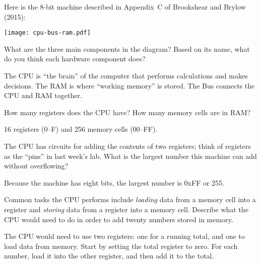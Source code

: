 \label{architecture}

Here is the 8-bit machine described in Appendix~C of Brookshear and Brylow (2015):

\begin{center}
\texttt{[image: cpu-bus-ram.pdf]}
\end{center}




\Q What are the three main components in the diagram?
Based on its name, what do you think each hardware component does?

\begin{answer}
The CPU is ``the brain'' of the computer that performs calculations and makes decisions.
The RAM is where ``working memory'' is stored.
The Bus connects the CPU and RAM together.
\end{answer}


\Q How many registers does the CPU have? How many memory cells are in RAM?

\begin{answer}[3em]
16 registers (0--F) and 256 memory cells (00--FF).
\end{answer}


\Q The CPU has circuits for adding the contents of two registers; think of registers as the ``pins'' in last week's lab.
What is the largest number this machine can add without overflowing?

\begin{answer}
Because the machine has eight bits, the largest number is 0xFF or 255.
\end{answer}


\Q Common tasks the CPU performs include \emph{loading} data from a memory cell into a register and \emph{storing} data from a register into a memory cell.
Describe what the CPU would need to do in order to add twenty numbers stored in memory.

\begin{answer}[7em]
The CPU would need to use two registers: one for a running total, and one to load data from memory.
Start by setting the total register to zero.
For each number, load it into the other register, and then add it to the total.
\end{answer}
